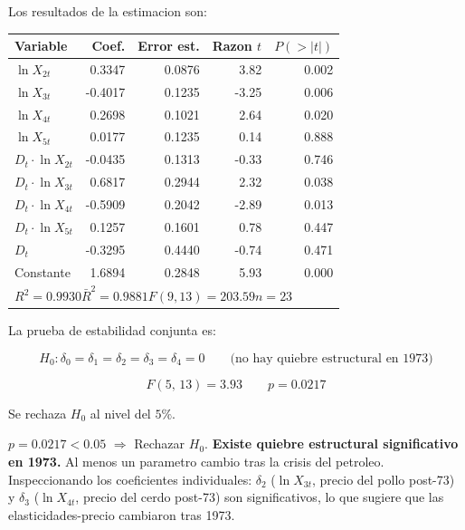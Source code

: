 \documentclass[12pt, letterpaper]{article}
\begin{document}
Los resultados de la estimacion son:

\begin{center}
\renewcommand{\arraystretch}{1.3}
\small
\begin{tabular}{lrrrr}
\toprule
\textbf{Variable} & \textbf{Coef.} & \textbf{Error est.} & \textbf{Razon $t$} & \textbf{$P(>|t|)$} \\
\midrule
$\ln X_{2t}$             &  0.3347 & 0.0876 &  3.82 & 0.002 \\
$\ln X_{3t}$             & -0.4017 & 0.1235 & -3.25 & 0.006 \\
$\ln X_{4t}$             &  0.2698 & 0.1021 &  2.64 & 0.020 \\
$\ln X_{5t}$             &  0.0177 & 0.1235 &  0.14 & 0.888 \\
$D_t \cdot \ln X_{2t}$   & -0.0435 & 0.1313 & -0.33 & 0.746 \\
$D_t \cdot \ln X_{3t}$   &  0.6817 & 0.2944 &  2.32 & 0.038 \\
$D_t \cdot \ln X_{4t}$   & -0.5909 & 0.2042 & -2.89 & 0.013 \\
$D_t \cdot \ln X_{5t}$   &  0.1257 & 0.1601 &  0.78 & 0.447 \\
$D_t$                    & -0.3295 & 0.4440 & -0.74 & 0.471 \\
Constante                &  1.6894 & 0.2848 &  5.93 & 0.000 \\
\midrule
\multicolumn{5}{l}{$R^2 = 0.9930$\quad $\bar{R}^2 = 0.9881$\quad $F(9,13) = 203.59$\quad $n = 23$} \\
\bottomrule
\end{tabular}
\end{center}

La prueba de estabilidad conjunta es:

\begin{equation}
  H_0: \delta_0 = \delta_1 = \delta_2 = \delta_3 = \delta_4 = 0
  \qquad \text{(no hay quiebre estructural en 1973)}
\end{equation}

\begin{equation}
  F(5,\,13) = 3.93 \qquad p = 0.0217
\end{equation}

Se rechaza $H_0$ al nivel del $5\%$.

\begin{clave}
  $p = 0.0217 < 0.05$ $\Rightarrow$ Rechazar $H_0$.
  \textbf{Existe quiebre estructural significativo en 1973.}
  Al menos un parametro cambio tras la crisis del petroleo.
  Inspeccionando los coeficientes individuales: $\delta_2$ ($\ln X_{3t}$,
  precio del pollo post-73) y $\delta_3$ ($\ln X_{4t}$, precio del cerdo
  post-73) son significativos, lo que sugiere que las elasticidades-precio
  cambiaron tras 1973.
\end{clave}
\end{document}
